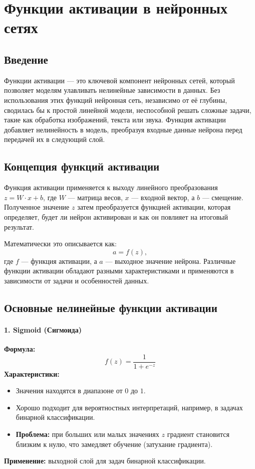 \documentclass[a4paper,12pt]{article}
\begin{document}
\section*{Функции активации в нейронных сетях}

\subsection*{Введение}
Функции активации — это ключевой компонент нейронных сетей, который позволяет моделям улавливать нелинейные зависимости в данных. Без использования этих функций нейронная сеть, независимо от её глубины, сводилась бы к простой линейной модели, неспособной решать сложные задачи, такие как обработка изображений, текста или звука. Функция активации добавляет нелинейность в модель, преобразуя входные данные нейрона перед передачей их в следующий слой.

\subsection*{Концепция функций активации}
Функция активации применяется к выходу линейного преобразования $z = W \cdot x + b$, где $W$ — матрица весов, $x$ — входной вектор, а $b$ — смещение. Полученное значение $z$ затем преобразуется функцией активации, которая определяет, будет ли нейрон активирован и как он повлияет на итоговый результат.

Математически это описывается как:
\[
    a = f(z),
\]
где $f$ — функция активации, а $a$ — выходное значение нейрона. Различные функции активации обладают разными характеристиками и применяются в зависимости от задачи и особенностей данных.

\subsection*{Основные нелинейные функции активации}

\paragraph{1. Sigmoid (Сигмоида)}
\textbf{Формула:}
\[
    f(z) = \frac{1}{1 + e^{-z}}
\]
\textbf{Характеристики:}
\begin{itemize}
    \item Значения находятся в диапазоне от $0$ до $1$.
    \item Хорошо подходит для вероятностных интерпретаций, например, в задачах бинарной классификации.
    \item \textbf{Проблема:} при больших или малых значениях $z$ градиент становится близким к нулю, что замедляет обучение (затухание градиента).
\end{itemize}
\textbf{Применение:} выходной слой для задач бинарной классификации.
\end{document}

